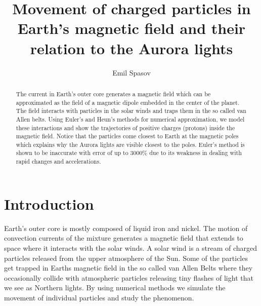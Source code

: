 \documentclass[final,5p,times,twocolumn,authoryear]{elsarticle}
\begin{document}
\begin{frontmatter}

\title{Movement of charged particles in Earth's magnetic field and their relation to the Aurora lights}

\author[first]{Emil Spasov}

\begin{abstract}
The current in Earth's outer core generates a magnetic field which can be approximated as the field of a magnetic dipole embedded in the center of the planet. The field interacts with particles in the solar winds and traps them in the so called van Allen belts. Using Euler's and Heun's methods for numerical approximation, we model these interactions and show the trajectories of positive charges (protons) inside the magnetic field. Notice that the particles come closest to Earth at the magnetic poles which explains why the Aurora lights are visible closest to the poles. Euler's method is shown to be inaccurate with error of up to 3000\% due to its weakness in dealing with rapid changes and accelerations.
\end{abstract}

\end{frontmatter}
\tableofcontents

\section{Introduction}
\label{introduction}
Earth's outer core is mostly composed of liquid iron and nickel. The motion of convection currents of the mixture generates a magnetic field that extends to space where it interacts with the solar winds. A solar wind is a stream of charged particles released from the upper atmosphere of the Sun. Some of the particles get trapped in Earths magnetic field in the so called van Allen Belts where they occasionally collide with atmospheric particles releasing tiny flashes of light that we see as Northern lights. By using numerical methods we simulate the movement of individual particles and study the phenomenon.
\end{document}
